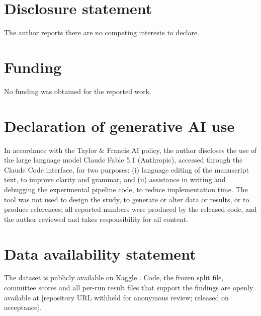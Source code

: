 \documentclass[11pt]{article}
\newcommand{\repourl}{[repository URL withheld for anonymous review; released on acceptance]}
\newcommand{\repourl}{\url{https://github.com/hz6yc3/attention-enhanced-unet-segmentation}}
\begin{document}
\section*{Disclosure statement}
The author reports there are no competing interests to declare.

\section*{Funding}
No funding was obtained for the reported work.

\section*{Declaration of generative AI use}
In accordance with the Taylor \& Francis AI policy, the author discloses the use of the large language model Claude Fable 5.1 (Anthropic), accessed through the Claude Code interface, for two purposes: (i) language editing of the manuscript text, to improve clarity and grammar, and (ii) assistance in writing and debugging the experimental pipeline code, to reduce implementation time. The tool was not used to design the study, to generate or alter data or results, or to produce references; all reported numbers were produced by the released code, and the author reviewed and takes responsibility for all content.

\section*{Data availability statement}
The dataset is publicly available on Kaggle \citep{sanadalali}. Code, the frozen split file, committee scores and all per-run result files that support the findings are openly available at \repourl.
\end{document}
